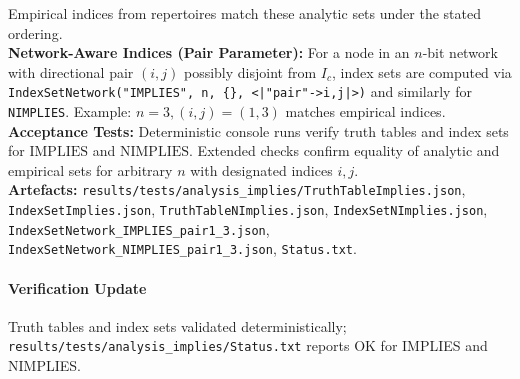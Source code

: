 \documentclass[11pt]{article}
\begin{document}
Empirical indices from repertoires match these analytic sets under the stated ordering.\\
\textbf{Network-Aware Indices (Pair Parameter):} For a node in an \(n\)-bit network with directional pair \((i,j)\) possibly disjoint from \(I_c\), index sets are computed via \texttt{IndexSetNetwork("IMPLIES", n, \{\}, \texttt{<|"pair"->{i,j}|>})} and similarly for \texttt{NIMPLIES}. Example: \(n=3, (i,j)=(1,3)\) matches empirical indices.\\
\textbf{Acceptance Tests:} Deterministic console runs verify truth tables and index sets for \(\mathrm{IMPLIES}\) and \(\mathrm{NIMPLIES}\). Extended checks confirm equality of analytic and empirical sets for arbitrary \(n\) with designated indices \(i,j\).\\
\textbf{Artefacts:} \texttt{results/tests/analysis\_implies/TruthTableImplies.json}, \texttt{IndexSetImplies.json}, \texttt{TruthTableNImplies.json}, \texttt{IndexSetNImplies.json}, \texttt{IndexSetNetwork\_IMPLIES\_pair1\_3.json}, \texttt{IndexSetNetwork\_NIMPLIES\_pair1\_3.json}, \texttt{Status.txt}.
\paragraph{Verification Update} Truth tables and index sets validated deterministically; \texttt{results/tests/analysis\_implies/Status.txt} reports OK for IMPLIES and NIMPLIES.
\end{document}
